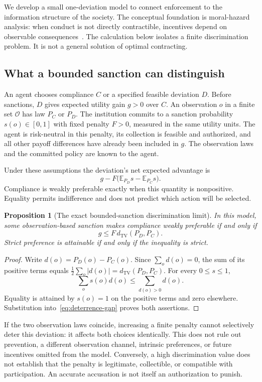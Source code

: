 \documentclass[11pt,letterpaper]{article}
\theoremstyle{plain}
\newtheorem{proposition}{Proposition}[section]
\theoremstyle{definition}
\theoremstyle{remark}
\newcommand{\TV}{d_{\mathrm{TV}}}
\newcommand{\E}{\mathbb E}
\begin{document}
We develop a small one-deviation model to connect enforcement to the information structure of the society. The conceptual foundation is moral-hazard analysis: when conduct is not directly contractible, incentives depend on observable consequences~\cite{holmstrom1979}. The calculation below isolates a finite discrimination problem. It is not a general solution of optimal contracting.

\subsection{What a bounded sanction can distinguish}
An agent chooses compliance $C$ or a specified feasible deviation $D$. Before sanctions, $D$ gives expected utility gain $g>0$ over $C$. An observation $o$ in a finite set $\mathcal O$ has law $P_C$ or $P_D$. The institution commits to a sanction probability $s(o)\in[0,1]$ with fixed penalty $F>0$, measured in the same utility units. The agent is risk-neutral in this penalty, its collection is feasible and authorized, and all other payoff differences have already been included in $g$. The observation laws and the committed policy are known to the agent.

Under these assumptions the deviation's net expected advantage is
\begin{equation}\label{eq:deterrence-gap}
g-F\bigl(\E_{P_D}s-\E_{P_C}s\bigr).
\end{equation}
Compliance is weakly preferable exactly when this quantity is nonpositive. Equality permits indifference and does not predict which action will be selected.

\begin{proposition}[The exact bounded-sanction discrimination limit]\label{prop:deterrence-tv}
In this model, some observation-based sanction makes compliance weakly preferable if and only if
\[
g\leq F\,\TV(P_D,P_C).
\]
Strict preference is attainable if and only if the inequality is strict.
\end{proposition}
\begin{proof}
Write $d(o)=P_D(o)-P_C(o)$. Since $\sum_o d(o)=0$, the sum of its positive terms equals $\frac12\sum_o|d(o)|=\TV(P_D,P_C)$. For every $0\leq s\leq1$,
\[
\sum_o s(o)d(o)\leq\sum_{d(o)>0}d(o).
\]
Equality is attained by $s(o)=1$ on the positive terms and zero elsewhere. Substitution into~\eqref{eq:deterrence-gap} proves both assertions.
\end{proof}

If the two observation laws coincide, increasing a finite penalty cannot selectively deter this deviation: it affects both choices identically. This does not rule out prevention, a different observation channel, intrinsic preferences, or future incentives omitted from the model. Conversely, a high discrimination value does not establish that the penalty is legitimate, collectible, or compatible with participation. An accurate accusation is not itself an authorization to punish.
\end{document}
